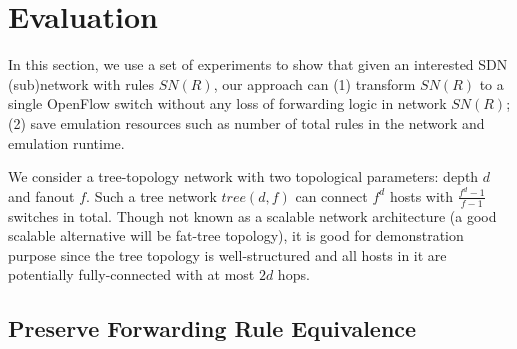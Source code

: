 \section{Evaluation}
In this section, we use a set of experiments to show that
given an interested SDN (sub)network with rules $SN(R)$, our approach can 
(1) transform $SN(R)$ to a single OpenFlow switch without any loss of forwarding logic in network $SN(R)$;
(2) save emulation resources such as number of total rules in the network and emulation runtime.

We consider a tree-topology network with two topological parameters: depth $d$ and fanout $f$.
Such a tree network $tree(d, f)$ can connect $f^d$ hosts with $\frac{f^d - 1}{f-1}$ switches in total.
Though not known as a scalable network architecture
(a good scalable alternative will be fat-tree topology),
it is good for demonstration purpose since the tree topology is well-structured and
all hosts in it are potentially fully-connected with at most $2d$ hops.

\subsection{Preserve Forwarding Rule Equivalence}
\label{SubSec:PreserveForwardingLogic}

